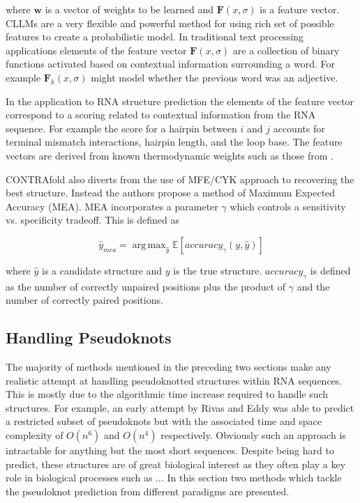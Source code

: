 \documentclass[journal]{IEEEtran}
\DeclareMathOperator*{\argmax}{arg\,max}
\begin{document}
where $\mathbf{w}$ is a vector of weights to be learned and $\mathbf{F}(x, \sigma)$ is a feature vector. CLLMs are a very flexible and powerful method for using rich set of possible features to create a probabilistic model. In traditional text processing applications elements of the feature vector $\mathbf{F}(x, \sigma)$ are a collection of binary functions activated based on contextual information surrounding a word. For example $\mathbf{F}_k(x, \sigma)$ might model whether the previous word was an adjective. 

In the application to RNA structure prediction the elements of the feature vector correspond to a scoring related to contextual information from the RNA sequence. For example the score for a hairpin between $i$ and $j$ accounts for terminal mismatch interactions, hairpin length, and the loop base. The feature vectors are derived from known thermodynamic weights such as those from \cite{mathews1999expanded}.

CONTRAfold also diverts from the use of MFE/CYK approach to recovering the best structure. Instead the authors propose a method of Maximum Expected Accuracy (MEA). MEA incorporates a parameter $\gamma$ which controls a sensitivity vs. specificity tradeoff. This is defined as

\begin{equation}
	\hat{y}_{mea} = \argmax_{\hat{y}} \mathbb{E}[accuracy_{\gamma}(y, \hat{y})]
\end{equation}

where $\hat{y}$ is a candidate structure and $y$ is the true structure. $accuracy_{\gamma}$ is defined as the number of correctly unpaired positions plus the product of $\gamma$ and the number of correctly paired positions. 

\subsection{Handling Pseudoknots}
\label{subsec:secondary-pseudoknots}
The majority of methods mentioned in the preceding two sections make any realistic attempt at handling pseudoknotted structures within RNA sequences. This is mostly due to the algorithmic time increase required to handle such structures. For example, an early attempt by Rivas and Eddy \cite{rivas1999dynamic} was able to predict a restricted subset of pseudoknots but with the associated time and space complexity of $O(n^6)$ and $O(n^4)$ respectively. Obviously such an approach is intractable for anything but the most short sequences. Despite being hard to predict, these structures are of great biological interest as they often play a key role in biological processes \cite{citation required} such as ... In this section two methods which tackle the pseudoknot prediction from different paradigms are presented.
\end{document}
